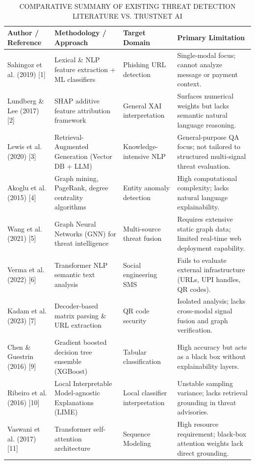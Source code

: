 \documentclass[conference,a4paper]{IEEEtran}
\begin{document}
\begin{table}[t]
\centering
\caption{COMPARATIVE SUMMARY OF EXISTING THREAT DETECTION LITERATURE VS. TRUSTNET AI}
\begin{tabular}{p{2.5cm} p{3.5cm} p{2.5cm} p{7cm}}
\toprule
\textbf{Author / Reference} & \textbf{Methodology / Approach} & \textbf{Target Domain} & \textbf{Primary Limitation} \\
\midrule
Sahingoz et al. (2019) [1] & Lexical \& NLP feature extraction + ML classifiers & Phishing URL detection & Single-modal focus; cannot analyze message or payment context. \\
\addlinespace
Lundberg \& Lee (2017) [2] & SHAP additive feature attribution framework & General XAI interpretation & Surfaces numerical weights but lacks semantic natural language reasoning. \\
\addlinespace
Lewis et al. (2020) [3] & Retrieval-Augmented Generation (Vector DB + LLM) & Knowledge-intensive NLP & General-purpose QA focus; not tailored to structured multi-signal threat evaluation. \\
\addlinespace
Akoglu et al. (2015) [4] & Graph mining, PageRank, degree centrality algorithms & Entity anomaly detection & High computational complexity; lacks natural language explainability. \\
\addlinespace
Wang et al. (2021) [5] & Graph Neural Networks (GNN) for threat intelligence & Multi-source threat fusion & Requires extensive static graph data; limited real-time web deployment capability. \\
\addlinespace
Verma et al. (2022) [6] & Transformer NLP semantic text analysis & Social engineering SMS & Fails to evaluate external infrastructure (URLs, UPI handles, QR codes). \\
\addlinespace
Kadam et al. (2023) [7] & Decoder-based matrix parsing \& URL extraction & QR code security & Isolated analysis; lacks cross-modal signal fusion and graph verification. \\
\addlinespace
Chen \& Guestrin (2016) [9] & Gradient boosted decision tree ensemble (XGBoost) & Tabular classification & High accuracy but acts as a black box without explainability layers. \\
\addlinespace
Ribeiro et al. (2016) [10] & Local Interpretable Model-agnostic Explanations (LIME) & Local classifier interpretation & Unstable sampling variance; lacks retrieval grounding in threat advisories. \\
\addlinespace
Vaswani et al. (2017) [11] & Transformer self-attention architecture & Sequence Modeling & High resource requirement; black-box attention weights lack direct grounding. \\

\end{tabular}
\end{table}
\end{document}
